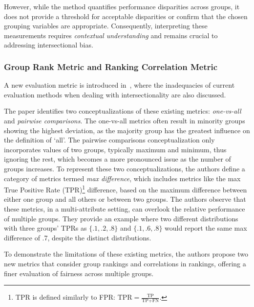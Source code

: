 However, while the method quantifies performance disparities across groups, it does not provide a threshold for acceptable disparities or confirm that the chosen grouping variables are appropriate. Consequently, interpreting these measurements requires \emph{contextual understanding} and remains crucial to addressing intersectional bias.


\subsubsection{Group Rank Metric and Ranking Correlation Metric}
\label{subsec:intrank_meth_metr_20n}

A new evaluation metric is introduced in~\cite{wang2022towards}, where the inadequacies of current evaluation methods when dealing with intersectionality are also discussed.

The paper identifies two conceptualizations of these existing metrics: \emph{one-vs-all} and \emph{pairwise comparisons}. The one-vs-all metrics often result in minority groups showing the highest deviation, as the majority group has the greatest influence on the definition of `all'. The pairwise comparisons conceptualization only incorporates values of two groups, typically maximum and minimum, thus ignoring the rest, which becomes a more pronounced issue as the number of groups increases.
To represent these two conceptualizations, the authors define a category of metrics termed \emph{max difference}, which includes metrics like the max True Positive Rate (TPR)\footnote{TPR is defined similarly to FPR: $\text{TPR} = \frac{\text{TP}}{\text{TP} + \text{FN}}$.} difference, based on the maximum difference between either one group and all others or between two groups.
The authors observe that these metrics, in a multi-attribute setting, can overlook the relative performance of multiple groups. They provide an example where two different distributions with three groups' TPRs as $\{.1, .2, .8\}$ and $\{.1, .6, .8\}$ would report the same max difference of .7, despite the distinct distributions.

To demonstrate the limitations of these existing metrics, the authors propose two new metrics that consider group rankings and correlations in rankings, offering a finer evaluation of fairness across multiple groups.

